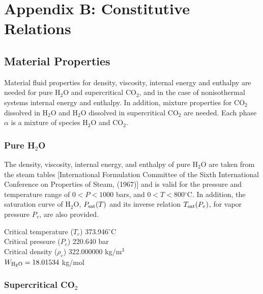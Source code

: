 \documentclass[12pt]{article}
\newcommand{\degc}{$^\circ$C}
\renewcommand{\c}{{\rm CO_2}}
\renewcommand{\a}{{\alpha}}
\begin{document}
\renewcommand{\theequation}{B-\arabic{equation}}
\setcounter{equation}{0}

\section*{Appendix B: Constitutive Relations}

\renewcommand{\thesubsection}{B-\arabic{subsection}}
\setcounter{subsection}{0}

\subsection{Material Properties}

Material fluid properties for density, viscosity, internal energy and enthalpy are needed for pure H$_2$O and supercritical CO$_2$, and in the case of nonisothermal systems internal energy and enthalpy. In addition, mixture properties for CO$_2$ dissolved in H$_2$O and H$_2$O dissolved in supercritical CO$_2$ are needed. 
Each phase $\a$ is a mixture of species H$_2$O and CO$_2$. 


\subsubsection{Pure H$_2$O}

The density, viscosity, internal energy, and enthalpy of pure H$_2$O are taken from the steam tables [International Formulation Committee of the Sixth International Conference on Properties of Steam, (1967)] and is valid for the pressure and temperature range of $0 \!<\! P \!<\! 1000$ bars, and $0 \!<\! T \!<\! 800$\degc. In addition, the saturation curve of H$_2$O, $P_{\rm sat}(T)$ and its inverse relation $T_{\rm sat}(P_v)$, for vapor pressure $P_v$, are also provided.

\noindent
Critical temperature ($T_c$) 373.946\degc\\
Critical pressure ($P_c$) 220.640 bar\\
Critical density ($\rho_c$) 322.000000 kg/m$^3$\\
$W_{\rm H_2O} = 18.01534$ kg/mol

\subsubsection{Supercritical CO$_2$}
\end{document}
